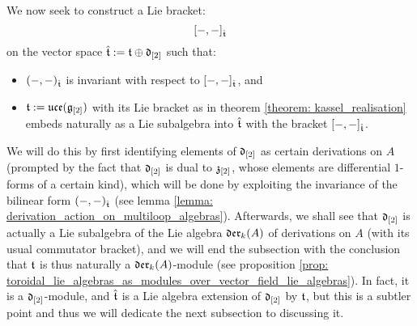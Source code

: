         We now seek to construct a Lie bracket:
            $$[-, -]_{\hat{\mathfrak{t}}}$$
        on the vector space $\hat{\mathfrak{t}} := \mathfrak{t} \oplus \mathfrak{d}_{[2]}$ such that:
        \begin{itemize}
            \item $(-, -)_{\hat{\mathfrak{t}}}$ is invariant with respect to $[-, -]_{\hat{\mathfrak{t}}}$, and
            \item $\mathfrak{t} := \mathfrak{uce}(\mathfrak{g}_{[2]})$ with its Lie bracket as in theorem \ref{theorem: kassel_realisation} embeds naturally as a Lie subalgebra into $\hat{\mathfrak{t}}$ with the bracket $[-, -]_{\hat{\mathfrak{t}}}$. 
        \end{itemize}
        We will do this by first identifying elements of $\mathfrak{d}_{[2]}$ as certain derivations on $A$ (prompted by the fact that $\mathfrak{d}_{[2]}$ is dual to $\mathfrak{z}_{[2]}$, whose elements are differential $1$-forms of a certain kind), which will be done by exploiting the invariance of the bilinear form $(-, -)_{\hat{\mathfrak{t}}}$ (see lemma \ref{lemma: derivation_action_on_multiloop_algebras}). Afterwards, we shall see that $\mathfrak{d}_{[2]}$ is actually a Lie subalgebra of the Lie algebra $\mathfrak{der}_k(A)$ of derivations on $A$ (with its usual commutator bracket), and we will end the subsection with the conclusion that $\mathfrak{t}$ is thus naturally a $\mathfrak{der}_k(A)$-module (see proposition \ref{prop: toroidal_lie_algebras_as_modules_over_vector_field_lie_algebras}). In fact, it is a $\mathfrak{d}_{[2]}$-module, and $\hat{\mathfrak{t}}$ is a Lie algebra extension of $\mathfrak{d}_{[2]}$ by $\mathfrak{t}$, but this is a subtler point and thus we will dedicate the next subsection to discussing it.  

